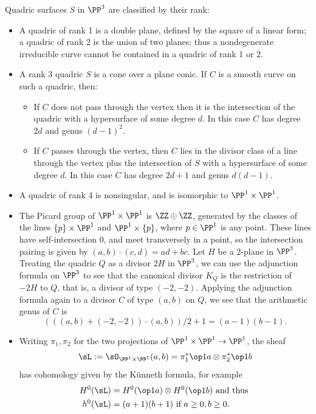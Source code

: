 \begin{example}[Quadrics in $\PP^3$]\label{Div of quadric}
 
Quadric surfaces $S$ in $\PP^3$ are classified by their rank:
\begin{itemize}
\item A quadric of rank 1 is a double plane, defined by the square of a linear form;
a quadric of rank 2 is the union of two planes; thus a nondegenerate irreducible curve cannot be contained in a quadric of rank 1 or 2.
\item A rank 3 quadric $S$ is a cone over a plane conic. If $C$ is a smooth
curve on such a quadric, then:
\begin{itemize}
\item  If $C$  does
not pass through the vertex then it is the intersection of the quadric with a hypersurface of some
degree $d$. In this case $C$ has degree $2d$ and genus $(d-1)^2$. 
 \item If $C$ passes through the vertex, then $C$ lies in the divisor class of a line through the vertex plus the intersection of $S$ with a hypersurface of some degree $d$. In this case $C$ has degree $2d+1$ and 
 genus $d(d-1)$. 
\end{itemize}


\item A quadric of rank 4 is nonsingular, and is isomorphic to $\PP^1\times \PP^1$.

\item The Picard group of $\PP^1\times \PP^1$ is $\ZZ\oplus \ZZ$, generated by the 
classes of the lines $\{p\}\times \PP^1$ and $\PP^1\times \{p\}$, where $p\in \PP^1$
is any point. These lines have self-intersection 0, and meet transversely in a point,
so the intersection pairing is given by $(a,b)\cdot(c,d) = ad+bc$. Let $H$ be a 2-plane in $\PP^3$.
Treating 
the quadric $Q$ as a divisor $2H$ in $\PP^3$, we can use the adjunction formula on $\PP^3$
to see that the canonical divisor $K_Q$ is the restriction of $-2H$ to $Q$, that is, a divisor of type $(-2,-2)$.
Applying the adjunction formula again to a divisor $C$ of type $(a,b)$ on $Q$, we see
that the arithmetic genus of $C$ is
$$
\left(((a,b)+(-2,-2))\cdot (a,b)\right)/2 +1 = (a-1)(b-1).
$$

\item Writing $\pi_1, \pi_2$ for the two projections of
$\PP^1\times \PP^1 \to \PP^1$, the sheaf 
$$
\sL := \sO_{\PP^1\times \PP^1}(a,b) = \pi_1^*\op1a \otimes \pi_2^*\op1b
$$
has cohomology given by the K\"unneth formula, for example
\begin{align*}
 H^0(\sL) &= H^0(\op1a)\otimes H^0(\op1b) \hbox{ and thus }\\
 h^0(\sL) &= (a+1)(b+1) \hbox{ if } a\geq 0, b\geq 0.
\end{align*}


\end{itemize}
\end{example}

